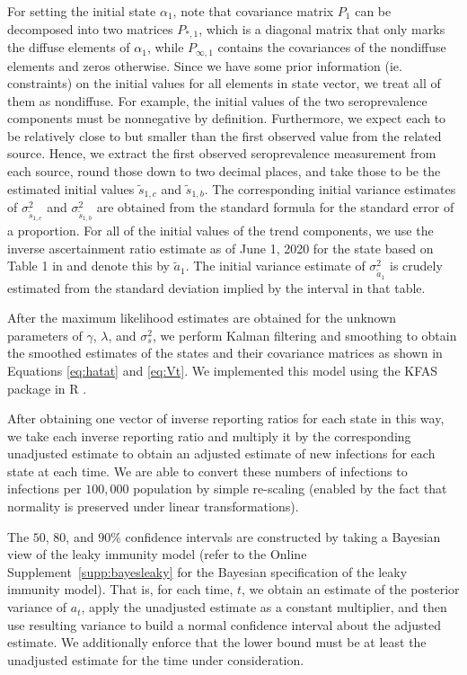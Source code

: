 \documentclass{article}
\begin{document}
For setting the initial state $\alpha_1$, note that covariance matrix $P_1$ can be decomposed into two matrices $P_{*, 1}$, which is a diagonal matrix that only marks the diffuse elements of $\alpha_1$, while $P_{\infty, 1}$ contains the covariances of the nondiffuse elements and zeros otherwise.  Since we have some prior information (ie. constraints) on the initial values for all elements in state vector, we treat all of them as nondiffuse. For example, the initial values of the two seroprevalence components must be nonnegative by definition. Furthermore, we expect each to be relatively close to but smaller than the first observed value from the related source. Hence, we extract the first observed seroprevalence measurement from each source, round those down to two decimal places, and take those to be the estimated initial values $\tilde{s}_{1,c}$ and
$\tilde{s}_{1,b}$. The corresponding initial variance estimates of $\sigma^2_{\tilde{s}_{1,c}}$ and $\sigma^2_{\tilde{s}_{1,b}}$ are obtained from the standard formula for the standard error of a proportion. For all of the initial values of the trend components, we use the inverse ascertainment ratio estimate as of June 1, 2020 for the state based on Table 1 in \citet{unwin2020state} and denote this by $\tilde{a}_1$. The initial variance estimate of $\sigma^2_{\tilde{a}_1}$ is crudely estimated from the standard deviation implied by the interval in that table.  %

After the maximum likelihood estimates are obtained for the unknown parameters of $\gamma$, $\lambda$, and $\sigma^2_s$, we perform Kalman filtering and smoothing to obtain the smoothed estimates of the states and their covariance matrices as shown in Equations \ref{eq:hatat} and \ref{eq:Vt}. We implemented this model using the KFAS package in R \citep{helske2016kfas}. 

After obtaining one vector of inverse reporting ratios for each state in this way, we take each inverse reporting ratio and multiply it by the corresponding unadjusted estimate to obtain an adjusted estimate of new infections for each state at each time. We are able to convert these numbers of infections to infections per $100,000$ population by simple re-scaling (enabled by the fact that normality is preserved under linear transformations).

The $50$, $80$, and $90\%$ confidence intervals are constructed by taking a Bayesian view of the leaky immunity model (refer to the Online Supplement~\ref{supp:bayesleaky} for the Bayesian specification of the leaky immunity model). That is, for each time, $t$, we obtain an estimate of the posterior variance of $a_t$, apply the unadjusted estimate as a constant multiplier, and then use resulting variance to build a normal confidence interval about the adjusted estimate. We additionally enforce that the lower bound must be at least the unadjusted estimate for the time under consideration.
\end{document}
